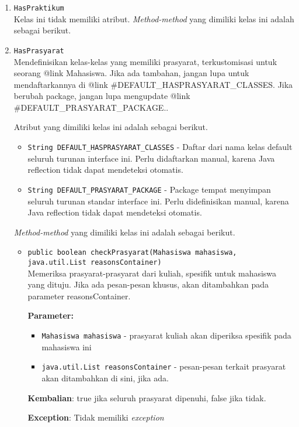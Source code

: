 \documentclass{article}
\begin{document}
\begin{enumerate}
\item \texttt{HasPraktikum}\\ 
Kelas ini tidak memiliki atribut. \textit{Method-method} yang dimiliki kelas ini adalah sebagai berikut.
\begin{itemize}
\end{itemize}
\item \texttt{HasPrasyarat}\\ 
Mendefinisikan kelas-kelas yang memiliki prasyarat, terkustomisasi untuk seorang {@link Mahasiswa}. Jika ada tambahan, jangan lupa untuk mendaftarkannya di {@link #DEFAULT_HASPRASYARAT_CLASSES}. Jika berubah package, jangan lupa mengupdate {@link #DEFAULT_PRASYARAT_PACKAGE}..

Atribut yang dimiliki kelas ini adalah sebagai berikut.
\begin{itemize}
\item \texttt{String DEFAULT_HASPRASYARAT_CLASSES} - Daftar dari nama kelas default seluruh turunan interface ini. Perlu didaftarkan
 manual, karena Java reflection tidak dapat mendeteksi otomatis.
\item \texttt{String DEFAULT_PRASYARAT_PACKAGE} - Package tempat menyimpan seluruh turunan standar interface ini. Perlu didefinisikan
 manual, karena Java reflection tidak dapat mendeteksi otomatis.
\end{itemize}
\textit{Method-method} yang dimiliki kelas ini adalah sebagai berikut.
\begin{itemize}
\item \texttt{public boolean checkPrasyarat(Mahasiswa mahasiswa, java.util.List reasonsContainer)}\\ 
Memeriksa prasyarat-prasyarat dari kuliah, spesifik untuk mahasiswa
 yang dituju. Jika ada pesan-pesan khusus, akan ditambahkan pada parameter
 reasonsContainer.

\textbf{Parameter:}
\begin{itemize}
\item \texttt{Mahasiswa mahasiswa} - 
prasyarat kuliah akan diperiksa spesifik pada mahasiswa ini
\item \texttt{java.util.List reasonsContainer} - 
pesan-pesan terkait prasyarat akan ditambahkan di sini, jika ada.
\end{itemize}
\textbf{Kembalian}: true jika seluruh prasyarat dipenuhi, false jika tidak.

\textbf{Exception}: Tidak memiliki \textit{exception}


\end{itemize}
\end{enumerate}
\end{document}

